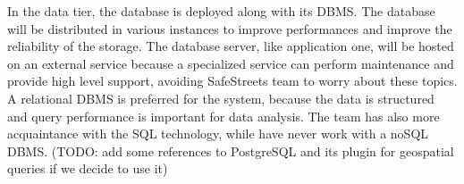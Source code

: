 In the data tier, the database is deployed along with its DBMS. The database will be distributed in various instances to improve performances and improve the reliability of the storage. The database server, like application one, will be hosted on an external service because a specialized service can perform maintenance and provide high level support, avoiding SafeStreets team to worry about these topics. A relational DBMS is preferred for the system, because the data is structured and query performance is important for data analysis. The team has also more acquaintance with the SQL technology, while have never work with a noSQL DBMS. (TODO: add some references to PostgreSQL and its plugin for geospatial queries if we decide to use it)
